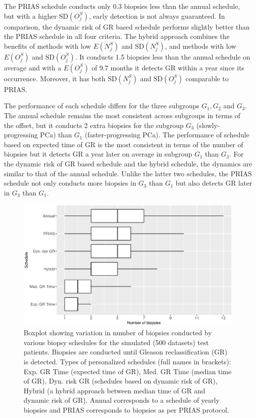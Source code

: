 The PRIAS schedule conducts only 0.3 biopsies less than the annual schedule, but with a higher $\mbox{SD}(O^S_j)$, early detection is not always guaranteed. In comparison, the dynamic risk of GR based schedule performs slightly better than the PRIAS schedule in all four criteria. The hybrid approach combines the benefits of methods with low $E(N^S_j)$ and $\mbox{SD}(N^S_j)$, and methods with low $E(O^S_j)$ and $\mbox{SD}(O^S_j)$. It conducts 1.5 biopsies less than the annual schedule on average and with a $E(O^S_j)$ of 9.7 months it detects GR within a year since its occurrence. Moreover, it has both $\mbox{SD}(N^S_j)$ and $\mbox{SD}(O^S_j)$ comparable to PRIAS.

The performance of each schedule differs for the three subgroups $G_1, G_2$ and $G_3$. The annual schedule remains the most consistent across subgroups in terms of the offset, but it conducts 2 extra biopsies for the subgroup $G_3$ (slowly-progressing PCa) than $G_1$ (faster-progressing PCa). The performance of schedule based on expected time of GR is the most consistent in terms of the number of biopsies but it detects GR a year later on average in subgroup $G_1$ than $G_3$. For the dynamic risk of GR based schedule and the hybrid schedule, the dynamics are similar to that of the annual schedule. Unlike the latter two schedules, the PRIAS schedule not only conducts more biopsies in $G_3$ than $G_1$ but also detects GR later in $G_3$ than $G_1$.

\begin{figure}[!htb]
\centerline{\includegraphics[width=\columnwidth]{images/sim_study/nbBoxPlot_all.eps}}
\caption{Boxplot showing variation in number of biopsies conducted by various biopsy schedules for the simulated (500 datasets) test patients. Biopsies are conducted until Gleason reclassification (GR) is detected. Types of personalized schedules (full names in brackets): Exp. GR Time (expected time of GR), Med. GR Time (median time of GR), Dyn. risk GR (schedules based on dynamic risk of GR), Hybrid (a hybrid approach between median time of GR and dynamic risk of GR). Annual corresponds to a schedule of yearly biopsies and PRIAS corresponds to biopsies as per PRIAS protocol.}
\label{fig : nbBoxPlot_all}
\end{figure}

